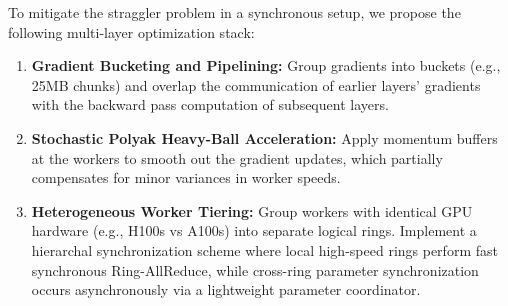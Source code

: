 To mitigate the straggler problem in a synchronous setup, we propose the following multi-layer optimization stack:
\begin{enumerate}
  \item \textbf{Gradient Bucketing and Pipelining:} Group gradients into buckets (e.g., 25MB chunks) and overlap the communication of earlier layers' gradients with the backward pass computation of subsequent layers.
  \item \textbf{Stochastic Polyak Heavy-Ball Acceleration:} Apply momentum buffers at the workers to smooth out the gradient updates, which partially compensates for minor variances in worker speeds.
  \item \textbf{Heterogeneous Worker Tiering:} Group workers with identical GPU hardware (e.g., H100s vs A100s) into separate logical rings. Implement a hierarchal synchronization scheme where local high-speed rings perform fast synchronous Ring-AllReduce, while cross-ring parameter synchronization occurs asynchronously via a lightweight parameter coordinator.
\end{enumerate}
